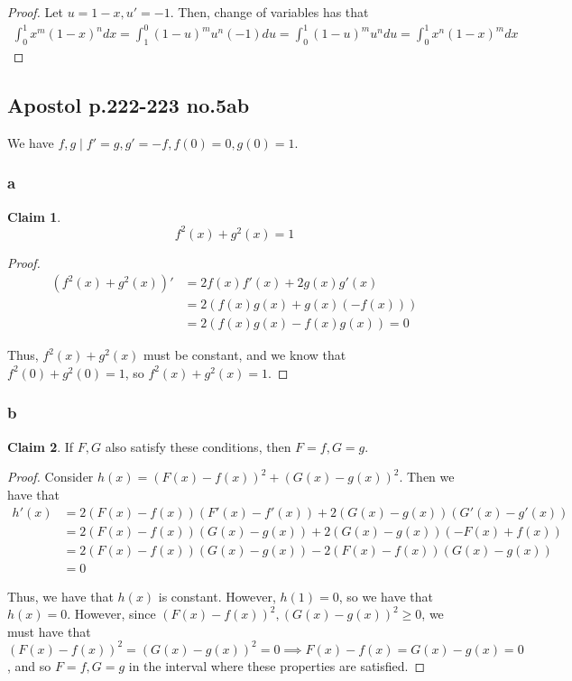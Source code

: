 \documentclass[12pt,letterpaper]{article}
\theoremstyle{definition}
\newtheorem*{claim}{Claim}
\begin{document}
\begin{proof}
  Let $u = 1-x, u' = -1$. Then, change of variables has that
  \begin{align*}
    \int_0^1x^m(1-x)^ndx = \int_1^0(1-u)^mu^n(-1)du = \int_0^1(1-u)^mu^ndu = \int_0^1x^n(1-x)^mdx
  \end{align*}
\end{proof}

\subsection*{Apostol p.222-223 no.5ab}

We have $f, g \mid f' = g, g' = -f, f(0) = 0, g(0) = 1$.

\subsubsection*{a}

\begin{claim}
  \[
    f^2(x) + g^2(x) = 1
  \]
\end{claim}

\begin{proof}
  \begin{align*}
    (f^2(x) + g^2(x))' &= 2f(x)f'(x) + 2g(x)g'(x) \\
                       &= 2(f(x)g(x) + g(x)(-f(x))) \\
                       &= 2(f(x)g(x) - f(x)g(x)) = 0
  \end{align*}

  Thus, $f^2(x) + g^2(x)$ must be constant, and we know that $f^2(0) + g^2(0) =
  1$, so $f^2(x) + g^2(x) = 1$.
\end{proof}

\subsubsection*{b}

\begin{claim}
  If $F,G$ also satisfy these conditions, then $F = f, G = g$.
\end{claim}

\begin{proof}
  Consider $h(x) = (F(x) - f(x))^2  + (G(x) - g(x))^2$. Then we have that
  \begin{align*}
    h'(x) &= 2(F(x) - f(x))(F'(x) - f'(x)) + 2(G(x) - g(x))(G'(x) - g'(x)) \\
          &= 2(F(x) - f(x))(G(x) - g(x)) + 2(G(x) - g(x))(-F(x) + f(x)) \\
          &= 2(F(x) - f(x))(G(x) - g(x)) - 2(F(x) - f(x))(G(x) - g(x)) \\
          &= 0
  \end{align*}

  Thus, we have that $h(x)$ is constant. However, $h(1) = 0$, so we have that
  $h(x) = 0$. However, since $(F(x) - f(x))^2, (G(x) - g(x))^2 \geq 0$, we must
  have that $(F(x) - f(x))^2 = (G(x) - g(x))^2 = 0 \implies F(x) - f(x) = G(x) -
  g(x) = 0$, and so $F = f, G = g$ in the interval where these properties are
  satisfied.
\end{proof}
\end{document}

